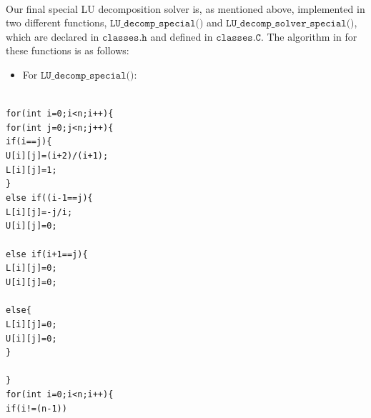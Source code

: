 \documentclass[12pt]{article}
\numberwithin{equation}{section}
\begin{document}
\\\indent Our final special LU decomposition solver is, as mentioned above, implemented in two different functions, $\texttt{LU\_decomp\_special()}$ and $\texttt{LU\_decomp\_solver\_special()}$, which are declared in $\texttt{classes.h}$ and defined in $\texttt{classes.C}$.  The algorithm in for these functions is as follows:

\begin{itemize}
\item For $\texttt{LU\_decomp\_special()}$:
\end{itemize}
\\\indent\indent\indent\texttt{for(int i=0;i<n;i++)\{ }
\\\indent\indent \indent \texttt{for(int j=0;j<n;j++)\{}
\\\indent\indent \indent \indent \texttt{if(i==j)\{}
\\ \indent\indent\indent\indent\indent \texttt{U[i][j]=(i+2)/(i+1);}
\\\indent\indent \indent\indent\indent \texttt{L[i][j]=1;}
\\\indent\indent \indent\indent \texttt{\}} 
\\\indent\indent \indent\indent \texttt{else if((i-1==j)\{} 
\\\indent\indent\indent\indent\indent \texttt{L[i][j]=-j/i;} 
\\\indent\indent \indent\indent\indent \texttt{U[i][j]=0;} 
\\ \indent\indent\indent\indent\textt{\}}
\\\indent\indent\indent\indent \texttt{else if(i+1==j)\{}
\\\indent\indent\indent\indent\indent \texttt{L[i][j]=0;}
\\\indent\indent\indent\indent\indent \texttt{U[i][j]=0;} 
\\\indent\indent\indent\indent\textt{\}}
\\\indent\indent\indent\indent \texttt{else\{}
\\\indent\indent\indent\indent\indent \texttt{L[i][j]=0;} 
\\\indent\indent\indent\indent\indent \texttt{U[i][j]=0;}
\\\indent\indent\indent\indent\texttt{\}}
\\\indent\indent\indent\textt{\}}
\\\indent\indent\texttt{\}}
\\\indent\indent\texttt{for(int i=0;i<n;i++)\{}
\\\indent\indent\indent \texttt{if(i!=(n-1))}
\end{document}
